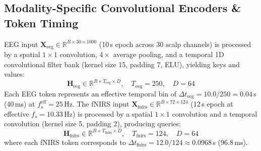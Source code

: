 \documentclass[journal]{IEEEtran}
\begin{document}
\subsection{Modality-Specific Convolutional Encoders \& Token Timing}
EEG input $\mathbf{X}_{\text{eeg}} \in \mathbb{R}^{B \times 30 \times 1000}$ (10\,s epoch across 30 scalp channels) is processed by a spatial $1 \times 1$ convolution, $4\times$ average pooling, and a temporal 1D convolutional filter bank (kernel size 15, padding 7, ELU), yielding keys and values:
\begin{equation}
\mathbf{H}_{\text{eeg}} \in \mathbb{R}^{B \times T_{\text{eeg}} \times D}, \quad T_{\text{eeg}} = 250, \quad D = 64
\end{equation}
Each EEG token represents an effective temporal bin of $\Delta t_{\text{eeg}} = 10.0 / 250 = 0.04$\,s (40\,ms) at $f_s^{\text{eff}} = 25$\,Hz. The fNIRS input $\mathbf{X}_{\text{fnirs}} \in \mathbb{R}^{B \times 72 \times 124}$ (12\,s epoch at effective $f_s = 10.33$\,Hz) is processed by a spatial $1 \times 1$ convolution and a temporal convolution (kernel size 5, padding 2), producing queries:
\begin{equation}
\mathbf{H}_{\text{fnirs}} \in \mathbb{R}^{B \times T_{\text{fnirs}} \times D}, \quad T_{\text{fnirs}} = 124, \quad D = 64
\end{equation}
where each fNIRS token corresponds to $\Delta t_{\text{fnirs}} = 12.0 / 124 \approx 0.0968$\,s (96.8\,ms).
\end{document}
